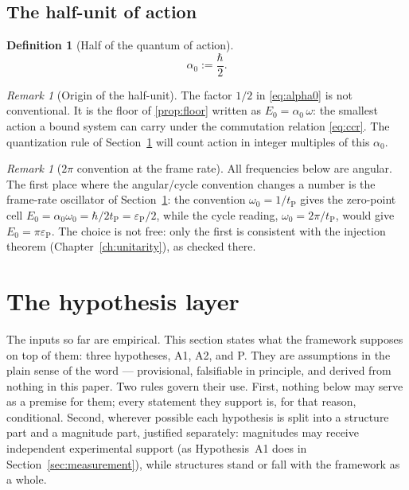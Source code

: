 \documentclass[11pt]{amsbook}
\theoremstyle{plain}
\theoremstyle{definition}
\newtheorem{definition}[theorem]{Definition}
\theoremstyle{remark}
\newtheorem{remark}[theorem]{Remark}
\begin{document}
\subsection{The half-unit of action}

\begin{definition}[Half of the quantum of action]\label{def:alpha0}
\begin{equation}\label{eq:alpha0}
\alpha_{0} := \frac{\hbar}{2}.
\end{equation}
\end{definition}

\begin{remark}[Origin of the half-unit]\label{rem:half}
The factor $1/2$ in \cref{eq:alpha0} is not conventional. It is the floor of \cref{prop:floor} written as $E_{0} = \alpha_{0}\,\omega$: the smallest action a bound system can carry under the commutation relation \cref{eq:ccr}. The quantization rule of Section~\ref{sec:hypotheses} will count action in integer multiples of this $\alpha_{0}$.
\end{remark}

\begin{remark}[$2\pi$ convention at the frame rate]\label{rem:framerate}
All frequencies below are angular. The first place where the angular/cycle convention changes a number is the frame-rate oscillator of Section~\ref{sec:hypotheses}: the convention $\omega_0 = 1/t_{\mathrm P}$ gives the zero-point cell $E_{0} = \alpha_0\omega_0 = \hbar/2t_{\mathrm P} = \varepsilon_{\mathrm P}/2$, while the cycle reading, $\omega_0 = 2\pi/t_{\mathrm P}$, would give $E_0 = \pi\varepsilon_{\mathrm P}$. The choice is not free: only the first is consistent with the injection theorem (Chapter~\ref{ch:unitarity}), as checked there.
\end{remark}


\section{The hypothesis layer}\label{sec:hypotheses}

The inputs so far are empirical. This section states what the framework supposes on top of them: three hypotheses, A1, A2, and P. They are assumptions in the plain sense of the word --- provisional, falsifiable in principle, and derived from nothing in this paper. Two rules govern their use. First, nothing below may serve as a premise for them; every statement they support is, for that reason, conditional. Second, wherever possible each hypothesis is split into a structure part and a magnitude part, justified separately: magnitudes may receive independent experimental support (as Hypothesis~A1 does in Section~\ref{sec:measurement}), while structures stand or fall with the framework as a whole.
\end{document}
